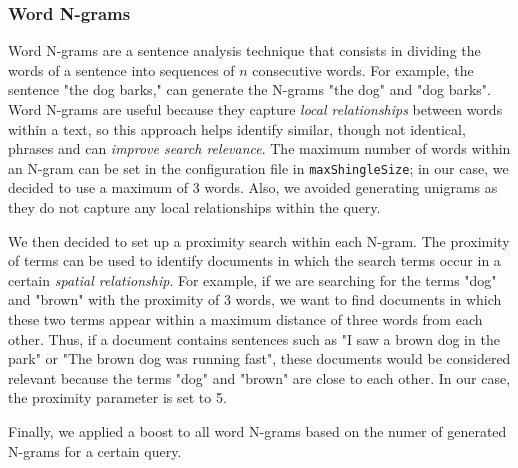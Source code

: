 \subsubsection{Word N-grams}
\label{subsubsec:shingles}

Word N-grams are a sentence analysis technique that consists in dividing the words of a sentence into sequences of $n$ consecutive words. For example, the sentence "the dog barks," can generate the N-grams "the dog" and "dog barks". Word N-grams are useful because they capture \emph{local relationships} between words within a text, so this approach helps identify similar, though not identical, phrases and can \emph{improve search relevance}.
The maximum number of words within an N-gram can be set in the configuration file in \texttt{maxShingleSize}; in our case, we decided to use a maximum of 3 words. Also, we avoided generating unigrams as they do not capture any local relationships within the query.

We then decided to set up a proximity search within each N-gram. The proximity of terms can be used to identify documents in which the search terms occur in a certain \emph{spatial relationship}.
For example, if we are searching for the terms "dog" and "brown" with the proximity of 3 words, we want to find documents in which these two terms appear within a maximum distance of three words from each other. Thus, if a document contains sentences such as "I saw a brown dog in the park" or "The brown dog was running fast", these documents would be considered relevant because the terms "dog" and "brown" are close to each other. In our case, the proximity parameter is set to 5.

Finally, we applied a boost to all word N-grams based on the numer of generated N-grams for a certain query.
